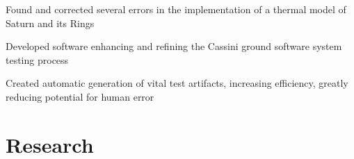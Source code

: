 \documentclass[letterpaper]{deedy-resume} %
\begin{document}
\begin{minipage}[t]{0.66\textwidth}
\begin{tightitemize}
\item Found and corrected several errors in the implementation of a thermal model of Saturn and its Rings
\item Developed software enhancing and refining the Cassini ground software system testing process
\item Created automatic generation of vital test artifacts, increasing efficiency, greatly reducing potential for human error
\end{tightitemize}






\section{Research}


\end{minipage}
\end{document}
